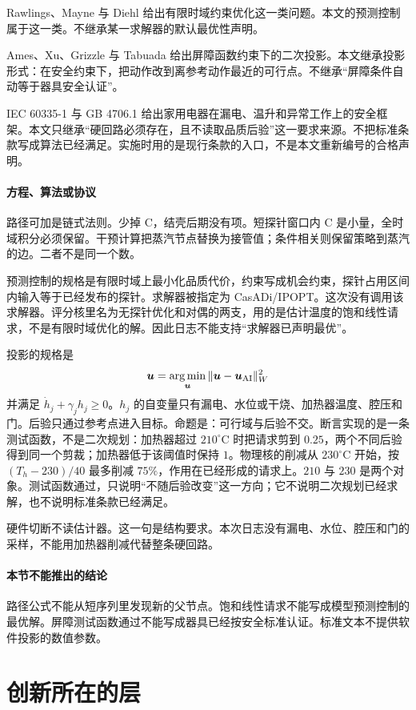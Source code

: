 Rawlings、Mayne 与 Diehl 给出有限时域约束优化这一类问题\cite{rawlings2017}。本文的预测控制属于这一类。不继承某一求解器的默认最优性声明。

Ames、Xu、Grizzle 与 Tabuada 给出屏障函数约束下的二次投影\cite{ames2017cbf}。本文继承投影形式：在安全约束下，把动作改到离参考动作最近的可行点。不继承“屏障条件自动等于器具安全认证”。

IEC 60335-1 与 GB 4706.1 给出家用电器在漏电、温升和异常工作上的安全框架\cite{iec60335,gb4706}。本文只继承“硬回路必须存在，且不读取品质后验”这一要求来源。不把标准条款写成算法已经满足。实施时用的是现行条款的入口，不是本文重新编号的合格声明。

\paragraph{方程、算法或协议}
路径可加是链式法则。少掉 C，结壳后期没有项。短探针窗口内 C 是小量，全时域积分必须保留。干预计算把蒸汽节点替换为接管值；条件相关则保留策略到蒸汽的边。二者不是同一个数。

预测控制的规格是有限时域上最小化品质代价，约束写成机会约束，探针占用区间内输入等于已经发布的探针。求解器被指定为 CasADi/IPOPT。这次没有调用该求解器。评分核里名为无探针优化和对偶的两支，用的是估计温度的饱和线性请求，不是有限时域优化的解。因此日志不能支持“求解器已声明最优”。

投影的规格是
\[
\bm{u}=\operatorname*{arg\,min}_{\bm{u}}\|\bm{u}-\bm{u}_{\mathrm{AI}}\|_W^2
\]
并满足 $\dot h_j+\gamma_j h_j\ge 0$。$h_j$ 的自变量只有漏电、水位或干烧、加热器温度、腔压和门。后验只通过参考点进入目标。命题是：可行域与后验不交。断言实现的是一条测试函数，不是二次规划：加热器超过 $210^\circ\mathrm{C}$ 时把请求剪到 $0.25$，两个不同后验得到同一个剪裁；加热器低于该阈值时保持 $1$。物理核的削减从 $230^\circ\mathrm{C}$ 开始，按 $(T_h-230)/40$ 最多削减 $75\%$，作用在已经形成的请求上。$210$ 与 $230$ 是两个对象。测试函数通过，只说明“不随后验改变”这一方向；它不说明二次规划已经求解，也不说明标准条款已经满足。

硬件切断不读估计器。这一句是结构要求。本次日志没有漏电、水位、腔压和门的采样，不能用加热器削减代替整条硬回路。

\paragraph{本节不能推出的结论}
路径公式不能从短序列里发现新的父节点。饱和线性请求不能写成模型预测控制的最优解。屏障测试函数通过不能写成器具已经按安全标准认证。标准文本不提供软件投影的数值参数。

\section{创新所在的层}

